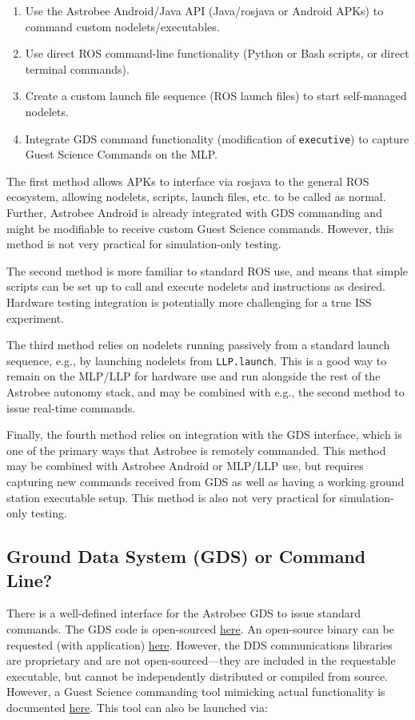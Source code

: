 \documentclass{article}
\begin{document}
\begin{enumerate}
    \item Use the Astrobee Android/Java API (Java/rosjava or Android APKs) to command custom nodelets/executables.
    \item Use direct ROS command-line functionality (Python or Bash scripts, or direct terminal commands).
    \item Create a custom launch file sequence (ROS launch files) to start self-managed nodelets.
    \item Integrate GDS command functionality (modification of \texttt{executive}) to capture Guest Science Commands on the MLP.
\end{enumerate}

The first method allows APKs to interface via rosjava to the general ROS ecosystem, allowing nodelets, scripts, launch files, etc. to be called as normal. Further, Astrobee Android is already integrated with GDS commanding and might be modifiable to receive custom Guest Science commands. However, this method is not very practical for simulation-only testing.

The second method is more familiar to standard ROS use, and means that simple scripts can be set up to call and execute nodelets and instructions as desired. Hardware testing integration is potentially more challenging for a true ISS experiment.

The third method relies on nodelets running passively from a standard launch sequence, e.g., by launching nodelets from \texttt{LLP.launch}. This is a good way to remain on the MLP/LLP for hardware use and run alongside the rest of the Astrobee autonomy stack, and may be combined with e.g., the second method to issue real-time commands.

Finally, the fourth method relies on integration with the GDS interface, which is one of the primary ways that Astrobee is remotely commanded. This method may be combined with Astrobee Android or MLP/LLP use, but requires capturing new commands received from GDS as well as having a working ground station executable setup. This method is also not very practical for simulation-only testing.

\subsection{Ground Data System (GDS) or Command Line?}

There is a well-defined interface for the Astrobee GDS to issue standard commands. The GDS code is open-sourced \href{https://github.com/nasa/astrobee_gds/}{here}. An open-source binary can be requested (with application) \href{https://software.nasa.gov/software/ARC-17994-1}{here}. However, the DDS communications libraries are proprietary and are not open-sourced---they are included in the requestable executable, but cannot be independently distributed or compiled from source. However, a Guest Science commanding tool mimicking actual functionality is documented \href{https://github.com/nasa/astrobee_android/blob/master/running_gs_app.md#4-guest-science-commanding}{here}. This tool can also be launched via:
\end{document}
